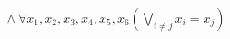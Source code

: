 \documentclass[preview]{standalone}
\begin{document}
\begin{align*}
\land \ \forall x_1, x_2, x_3, x_4, x_5, x_6 \left(\bigvee_{i \neq j} x_i = x_j\right)
\end{align*}
\end{document}
